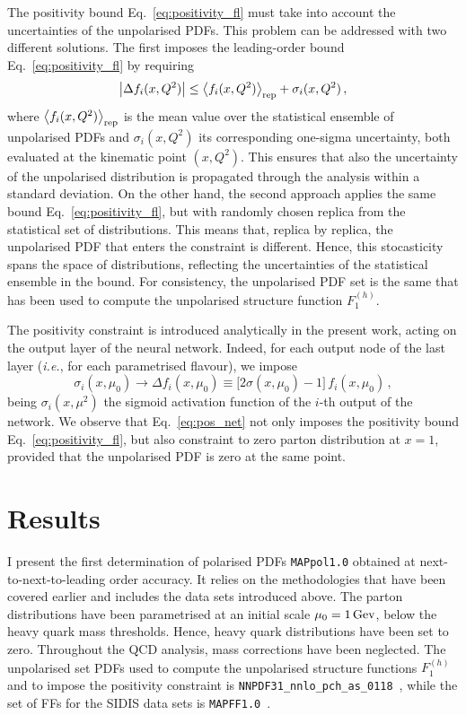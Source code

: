 The positivity bound Eq.~\eqref{eq:positivity_fl} must take into account the uncertainties of the unpolarised PDFs. This problem can be addressed with two different solutions. The first imposes the leading-order bound Eq.~\eqref{eq:positivity_fl} by requiring
\begin{equation}
  \left| \Delta f_i (x,Q^2) \right| \leq \left<f_i (x,Q^2)\right>_{\textrm{rep}} + \sigma_i(x,Q^2) \,,
  \label{eq:positivity_fl_sigma}
\end{equation}
where $\left<f_i (x,Q^2)\right>_{\textrm{rep}}$ is the mean value over the statistical ensemble of unpolarised PDFs and $\sigma_i(x,Q^2)$ its corresponding one-sigma uncertainty, both evaluated at the kinematic point $(x,Q^2)$. This ensures that also the uncertainty of the unpolarised distribution is propagated through the analysis within a standard deviation. On the other hand, the second approach applies the same bound Eq.~\eqref{eq:positivity_fl}, but with randomly chosen replica from the statistical set of distributions. This means that, replica by replica, the unpolarised PDF that enters the constraint is different. Hence, this stocasticity spans the space of distributions, reflecting the uncertainties of the statistical ensemble in the bound. For consistency, the unpolarised PDF set is the same that has been used to compute the unpolarised structure function $F_1^{(h)}$.%

The positivity constraint is introduced analytically in the present work, acting on the output layer of the neural network. Indeed, for each output node of the last layer (\textit{i.e.}, for each parametrised flavour), we impose
\begin{equation}
  \sigma_{i} (x,\mu_0) \rightarrow \Delta f_{i} (x, \mu_0) \equiv \bigl[ 2 \sigma(x,\mu_0) - 1 \bigr] \, f_{i} (x,\mu_0) \,,
  \label{eq:pos_net}
\end{equation}
being $\sigma_i(x,\mu^2)$ the sigmoid activation function of the $i$-th output of the network. We observe that Eq.~\eqref{eq:pos_net} not only imposes the positivity bound Eq.~\eqref{eq:positivity_fl}, but also constraint to zero parton distribution at $x=1$, provided that the unpolarised PDF is zero at the same point. 

\section{Results}
\label{sec:4.4}
I present the first determination of polarised PDFs \texttt{MAPpol1.0} obtained at next-to-next-to-leading order accuracy. It relies on the methodologies that have been covered earlier and includes the data sets introduced above. The parton distributions have been parametrised at an initial scale $\mu_0 = 1 \, \textrm{Gev}$, below the heavy quark mass thresholds. Hence, heavy quark distributions have been set to zero. Throughout the QCD analysis, mass corrections have been neglected. The unpolarised set PDFs used to compute the unpolarised structure functions $F_1^{(h)}$ and to impose the positivity constraint is \texttt{NNPDF31\_nnlo\_pch\_as\_0118}~\cite{NNPDF:2017mvq}, while the set of FFs for the SIDIS data sets is \texttt{MAPFF1.0}~\cite{Khalek:2021gxf, AbdulKhalek:2022laj}.%

